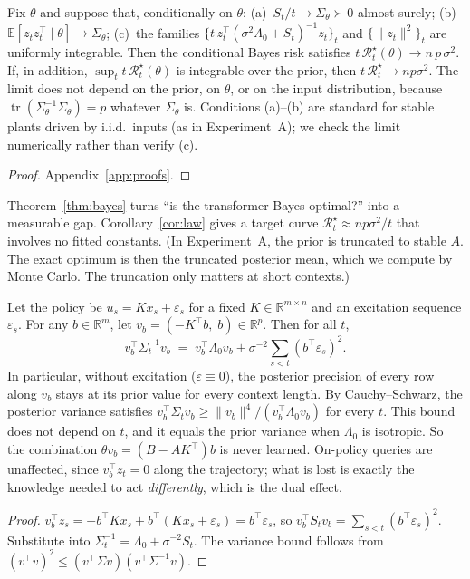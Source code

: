 \begin{corollary}\label{cor:law}
Fix $\theta$ and suppose that, conditionally on $\theta$: (a)~$S_t/t\to\Sigma_\theta\succ0$ almost surely; (b)~$\mathbb{E}[z_tz_t^\top\mid\theta]\to\Sigma_\theta$;
(c)~the families $\{t\,z_t^\top(\sigma^2\Lambda_0+S_t)^{-1}z_t\}_t$ and $\{\|z_t\|^2\}_t$ are uniformly integrable. Then
the conditional Bayes risk satisfies $t\,\mathcal{R}^\star_t(\theta)\to n\,p\,\sigma^2$. If, in addition,
$\sup_t t\,\mathcal{R}^\star_t(\theta)$ is integrable over the prior, then $t\,\mathcal{R}^\star_t\to np\sigma^2$. The limit
does not depend on the prior, on $\theta$, or on the input distribution, because
$\operatorname{tr}(\Sigma_\theta^{-1}\Sigma_\theta)=p$ whatever $\Sigma_\theta$ is. Conditions (a)--(b) are standard
for stable plants driven by i.i.d.\ inputs (as in Experiment~A); we check the limit numerically rather than verify (c).
\end{corollary}
\begin{proof}
Appendix~\ref{app:proofs}.
\end{proof}

Theorem~\ref{thm:bayes} turns ``is the transformer Bayes-optimal?'' into a measurable gap. Corollary~\ref{cor:law}
gives a target curve $\mathcal{R}^\star_t\approx np\sigma^2/t$ that involves no fitted constants. (In
Experiment~A, the prior is truncated to stable $A$. The exact optimum is then the truncated posterior mean, which
we compute by Monte Carlo. The truncation only matters at short contexts.)

\begin{proposition}\label{prop:ident}
Let the policy be $u_s=Kx_s+\varepsilon_s$ for a fixed $K\in\mathbb{R}^{m\times n}$ and an excitation sequence
$\varepsilon_s$. For any $b\in\mathbb{R}^m$, let $v_b=(-K^\top b,\;b)\in\mathbb{R}^p$. Then for all $t$,
\begin{equation}
v_b^\top \Sigma_t^{-1} v_b \;=\; v_b^\top\Lambda_0 v_b+\sigma^{-2}\textstyle\sum_{s<t}(b^\top\varepsilon_s)^2 .
\end{equation}
In particular, without excitation ($\varepsilon\equiv0$), the posterior precision of every row along $v_b$
stays at its prior value for every context length. By Cauchy--Schwarz, the posterior variance satisfies
$v_b^\top\Sigma_tv_b\ge\|v_b\|^4/(v_b^\top\Lambda_0v_b)$ for every $t$. This bound does not depend on $t$, and it equals the
prior variance when $\Lambda_0$ is isotropic. So the combination $\theta v_b=(B-AK^\top)b$ is never learned. On-policy
queries are unaffected, since $v_b^\top z_t=0$ along the trajectory; what is lost is exactly the knowledge needed to
act \emph{differently}, which is the dual effect.
\end{proposition}
\begin{proof}
$v_b^\top z_s=-b^\top Kx_s+b^\top(Kx_s+\varepsilon_s)=b^\top\varepsilon_s$, so
$v_b^\top S_tv_b=\sum_{s<t}(b^\top\varepsilon_s)^2$. Substitute into $\Sigma_t^{-1}=\Lambda_0+\sigma^{-2}S_t$. The
variance bound follows from $(v^\top v)^2\le(v^\top\Sigma v)(v^\top\Sigma^{-1}v)$.
\end{proof}

